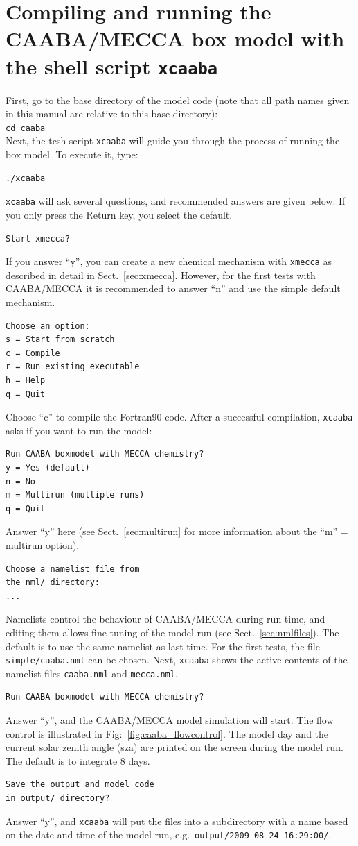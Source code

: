 \documentclass[twoside]{article}
\begin{document}
\section{Compiling and running the CAABA/MECCA box model with the shell
  script {\tt xcaaba}}
\label{sec:execute}

First, go to the base directory of the model code (note that all path
names given in this manual are relative to this base directory):\\[2mm]
{\tt cd caaba\_\meccaversion}\\[2mm]
Next, the tcsh script \verb|xcaaba| will guide you through the process
of running the box model. To execute it, type:
\begin{verbatim}
./xcaaba
\end{verbatim}
\verb|xcaaba| will ask several questions, and recommended answers are
given below. If you only press the Return key, you select the default.
\begin{verbatim}
Start xmecca?
\end{verbatim}
If you answer ``y'', you can create a new chemical mechanism with
\verb|xmecca| as described in detail in Sect.~\ref{sec:xmecca}. However,
for the first tests with CAABA/MECCA it is recommended to answer ``n''
and use the simple default mechanism.
\begin{verbatim}
Choose an option:
s = Start from scratch
c = Compile
r = Run existing executable
h = Help
q = Quit
\end{verbatim}
Choose ``c'' to compile the Fortran90 code. After a successful
compilation, \verb|xcaaba| asks if you want to run the model:
\begin{verbatim}
Run CAABA boxmodel with MECCA chemistry?
y = Yes (default)
n = No
m = Multirun (multiple runs)
q = Quit
\end{verbatim}
Answer ``y'' here (see Sect.~\ref{sec:multirun} for more information
about the ``m'' = multirun option).
\begin{verbatim}
Choose a namelist file from
the nml/ directory:
...
\end{verbatim}
Namelists control the behaviour of CAABA/MECCA during run-time, and
editing them allows fine-tuning of the model run (see
Sect.~\ref{sec:nmlfiles}). The default is to use the same namelist as
last time. For the first tests, the file \verb|simple/caaba.nml| can be
chosen. Next, \verb|xcaaba| shows the active contents of the namelist
files \verb|caaba.nml| and \verb|mecca.nml|.
\begin{verbatim}
Run CAABA boxmodel with MECCA chemistry?
\end{verbatim}
Answer ``y'', and the CAABA/MECCA model simulation will start. The flow
control is illustrated in Fig:~\ref{fig:caaba_flowcontrol}. The model
day and the current solar zenith angle (sza) are printed on the screen
during the model run. The default is to integrate 8 days.
\begin{verbatim}
Save the output and model code 
in output/ directory?
\end{verbatim}
Answer ``y'', and \verb|xcaaba| will put the files into a subdirectory
with a name based on the date and time of the model run, e.g.\
\verb|output/2009-08-24-16:29:00/|.
\end{document}
